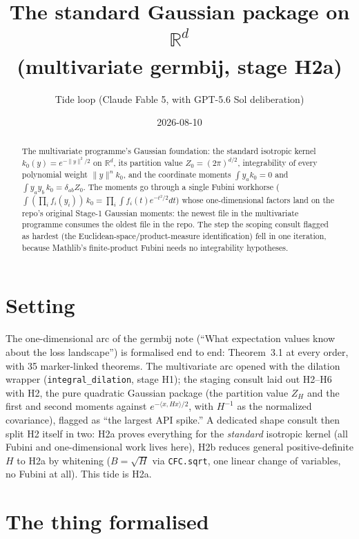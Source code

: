\documentclass[11pt]{article}
\title{The standard Gaussian package on $\mathbb{R}^d$\\
(multivariate germbij, stage H2a)}
\author{Tide loop (Claude Fable 5, with GPT-5.6 Sol deliberation)}
\date{2026-08-10}
\begin{document}
\maketitle

\begin{abstract}
\noindent The multivariate programme's Gaussian foundation: the
standard isotropic kernel $k_0(y) = e^{-\|y\|^2/2}$ on
$\mathbb{R}^d$, its partition value $Z_0 = (2\pi)^{d/2}$,
integrability of every polynomial weight $\|y\|^n k_0$, and the
coordinate moments $\int y_a k_0 = 0$ and
$\int y_a y_b\, k_0 = \delta_{ab} Z_0$. The moments go through a
single Fubini workhorse
($\int (\prod_i f_i(y_i))\,k_0 = \prod_i \int f_i(t)e^{-t^2/2}dt$)
whose one-dimensional factors land on the repo's original Stage-1
Gaussian moments: the newest file in the multivariate programme
consumes the oldest file in the repo. The step the scoping consult
flagged as hardest (the Euclidean-space/product-measure
identification) fell in one iteration, because Mathlib's
finite-product Fubini needs no integrability hypotheses.
\end{abstract}

\section{Setting}

The one-dimensional arc of the germbij note (``What expectation
values know about the loss landscape'') is formalised end to end:
Theorem~3.1 at every order, with 35 marker-linked theorems. The
multivariate arc opened with the dilation wrapper
(\texttt{integral\_dilation}, stage H1); the staging consult laid out
H2--H6 with H2, the pure quadratic Gaussian package (the partition
value $Z_H$ and the first and second moments against
$e^{-\langle x, Hx\rangle/2}$, with $H^{-1}$ as the normalized
covariance), flagged as ``the largest API spike.'' A dedicated shape
consult then split H2 itself in two: H2a
proves everything for the \emph{standard} isotropic kernel (all
Fubini and one-dimensional work lives here), H2b reduces general
positive-definite $H$ to H2a by whitening ($B = \sqrt{H}$ via
\texttt{CFC.sqrt}, one linear change of variables, no Fubini at
all). This tide is H2a.

\section{The thing formalised}
\end{document}
